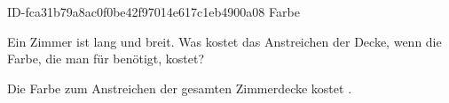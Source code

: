 \begin{exercise}
      {ID-fca31b79a8ac0f0be42f97014e617c1eb4900a08}
      {Farbe}
  \ifproblem\problem\par
    Ein Zimmer ist  lang und  breit. Was kostet das Anstreichen
    der Decke, wenn die Farbe, die man für  benötigt,  kostet?
  \fi
  \ifoutcome\outcome\par
    Die Farbe zum Anstreichen der gesamten Zimmerdecke kostet .
  \fi
\end{exercise}
